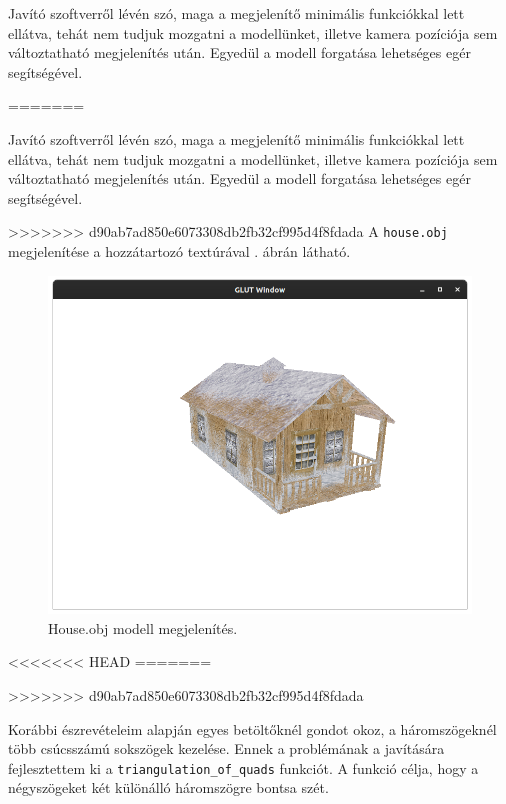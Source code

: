 Javító szoftverről lévén szó, maga a megjelenítő minimális funkciókkal lett ellátva, tehát nem tudjuk mozgatni  a modellünket, illetve kamera pozíciója sem változtatható megjelenítés után. Egyedül a modell forgatása lehetséges egér segítségével.

=======

Javító szoftverről lévén szó, maga a megjelenítő minimális funkciókkal lett ellátva, tehát nem tudjuk mozgatni  a modellünket, illetve kamera pozíciója sem változtatható megjelenítés után. Egyedül a modell forgatása lehetséges egér segítségével.

>>>>>>> d90ab7ad850e6073308db2fb32cf995d4f8fdada
A \texttt{house.obj} megjelenítése a hozzátartozó textúrával . ábrán látható.
\bigskip

\begin{figure}[h]
\centering
\includegraphics[width=\textwidth]{images/demo.png}
\caption{House.obj modell megjelenítés.}
\label{fig:demo}
\end{figure}
<<<<<<< HEAD
\newpage
=======

>>>>>>> d90ab7ad850e6073308db2fb32cf995d4f8fdada


Korábbi észrevételeim alapján egyes betöltőknél gondot okoz, a háromszögeknél több csúcsszámú sokszögek kezelése. Ennek a problémának a javítására fejlesztettem ki a \texttt{triangulation\_of\_quads} funkciót. A funkció célja, hogy a négyszögeket két különálló  háromszögre bontsa szét.

